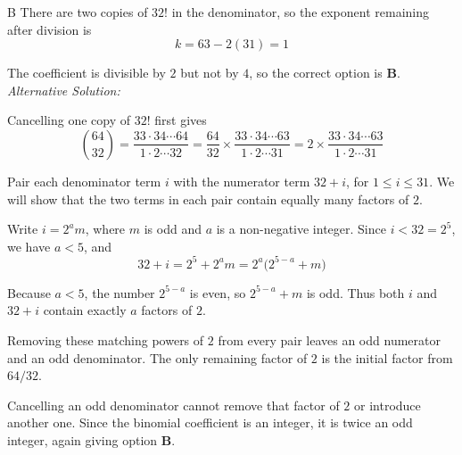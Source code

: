 \documentclass[11pt,a4paper]{article}
\begin{document}
\begin{enumerate}[label=\textbf{\arabic*.},leftmargin=*,itemsep=0pt,start=13]
\begin{djsSolution}{B}
There are two copies of $32!$ in the denominator, so the exponent remaining after division is
\[
k=63-2(31)=\boxed{1}
\]

The coefficient is divisible by $2$ but not by $4$, so the correct option is \textbf{B}.\\[5pt]

\textit{Alternative Solution:}

Cancelling one copy of $32!$ first gives
\[
\binom{64}{32}
=\frac{33\cdot34\cdots64}{1\cdot2\cdots32}
=\frac{64}{32}\times\frac{33\cdot34\cdots63}{1\cdot2\cdots31}
=2\times\frac{33\cdot34\cdots63}{1\cdot2\cdots31}
\]

Pair each denominator term $i$ with the numerator term $32+i$, for $1\leq i\leq31$. We will show that the two terms in each pair contain equally many factors of $2$.

Write $i=2^a m$, where $m$ is odd and $a$ is a non-negative integer. Since $i<32=2^5$, we have $a<5$, and
\[
32+i=2^5+2^a m=2^a\bigl(2^{5-a}+m\bigr)
\]

Because $a<5$, the number $2^{5-a}$ is even, so $2^{5-a}+m$ is odd. Thus both $i$ and $32+i$ contain exactly $a$ factors of $2$.

Removing these matching powers of $2$ from every pair leaves an odd numerator and an odd denominator. The only remaining factor of $2$ is the initial factor from $64/32$.

Cancelling an odd denominator cannot remove that factor of $2$ or introduce another one. Since the binomial coefficient is an integer, it is twice an odd integer, again giving option \textbf{B}.
\end{djsSolution}
\end{enumerate}
\clearpage
\thispagestyle{djssolutions}
\vspace*{8pt}
\end{document}
